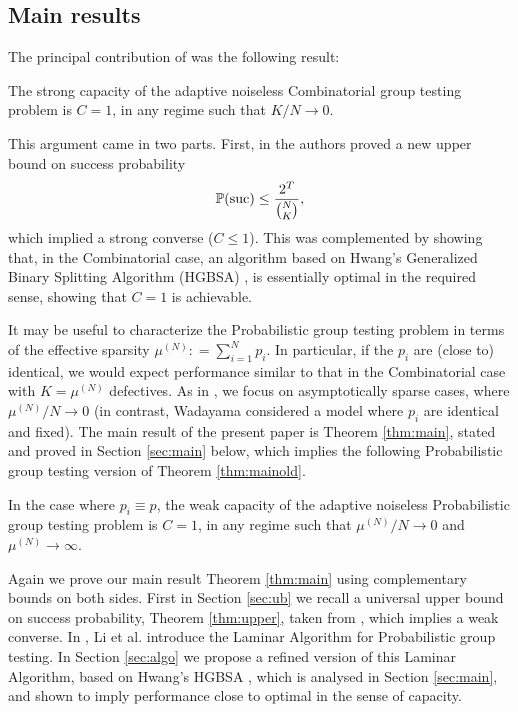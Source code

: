 \subsection{Main results}

The principal contribution of \cite[Theorem 1.2]{johnsonc10} was the following result:
%
\begin{theorem} \label{thm:mainold}
The strong capacity of the adaptive noiseless Combinatorial group testing problem
  is  $C = 1$,
  in any regime such that $K/N \rightarrow 0$.
\end{theorem}
%
This argument came in two parts. First, in \cite[Theorem 3.1]{johnsonc10} the authors  proved a new
upper bound on success probability 
\begin{equation} \label{eq:bja} {\mathbb{P}}({\mathrm{suc}}) \leq \frac{2^T}{\binom{N}{K}}, \end{equation} which implied a strong converse ($C \leq 1$). This was complemented 
by 
showing that, in the Combinatorial case, an algorithm based on 
Hwang's Generalized Binary Splitting Algorithm (HGBSA) \cite{hwang}, \cite{du} is essentially optimal in the required sense,
showing that $C=1$ is achievable.


It may be useful to characterize the Probabilistic group testing problem in 
terms of the effective sparsity $\mu^{(N)}: = \sum_{i=1}^N p_i$. In particular, if the $p_i$ are (close to) identical, we would expect performance similar to that in the Combinatorial
case with $K = \mu^{(N)}$ defectives. As in \cite{johnsonc10}, we  focus on asymptotically sparse cases, where $\mu^{(N)}/N \rightarrow 0$ (in contrast, Wadayama
\cite{} considered a model where $p_i$ are identical and fixed).
The main result of the present paper is Theorem \ref{thm:main}, stated and proved in Section \ref{sec:main} below, which implies the 
following  Probabilistic group testing version of Theorem \ref{thm:mainold}.
\begin{corollary} \label{cor:main}
 In the case where $p_i \equiv p$, the weak capacity of the adaptive noiseless Probabilistic group testing problem
  is  $C = 1$, in any regime such that $\mu^{(N)}/N \rightarrow 0$ and $\mu^{(N)} \rightarrow \infty$.
  \end{corollary}



Again we prove our main result Theorem \ref{thm:main} using complementary bounds on both sides. First in Section \ref{sec:ub} we recall
 a universal upper bound on success probability, Theorem \ref{thm:upper}, taken from
\cite{li5}, which implies a weak converse.   In \cite{li5}, Li et al. introduce
the Laminar Algorithm for Probabilistic group testing.  
In Section \ref{sec:algo} we propose a refined version of this Laminar Algorithm, based on Hwang's HGBSA \cite{hwang}, which is
analysed in Section \ref{sec:main}, and shown to imply performance close to optimal in the sense of capacity.

